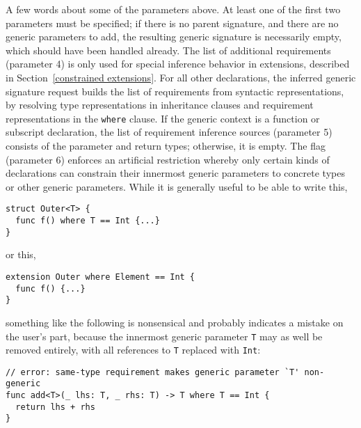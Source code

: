 \documentclass[../generics]{subfiles}
\begin{document}
A few words about some of the parameters above. At least one of the first two parameters must be specified; if there is no parent signature, and there are no generic parameters to add, the resulting generic signature is necessarily empty, which should have been handled already. The list of additional requirements (parameter 4) is only used for special inference behavior in extensions, described in Section~\ref{constrained extensions}. For all other declarations, the inferred generic signature request builds the list of requirements from syntactic representations, by resolving type representations in inheritance clauses and requirement representations in the \texttt{where} clause. If the generic context is a function or subscript declaration, the list of requirement inference sources (parameter 5) consists of the parameter and return types; otherwise, it is empty. The flag (parameter 6) enforces an artificial restriction whereby only certain kinds of declarations can constrain their innermost generic parameters to concrete types or other generic parameters. While it is generally useful to be able to write this,
\begin{Verbatim}
struct Outer<T> {
  func f() where T == Int {...}
}
\end{Verbatim}
or this,
\begin{Verbatim}
extension Outer where Element == Int {
  func f() {...}
}
\end{Verbatim}
something like the following is nonsensical and probably indicates a mistake on the user's part, because the innermost generic parameter \texttt{T} may as well be removed entirely, with all references to \texttt{T} replaced with \texttt{Int}:
\begin{Verbatim}
// error: same-type requirement makes generic parameter `T' non-generic
func add<T>(_ lhs: T, _ rhs: T) -> T where T == Int {
  return lhs + rhs
}
\end{Verbatim}
\end{document}
